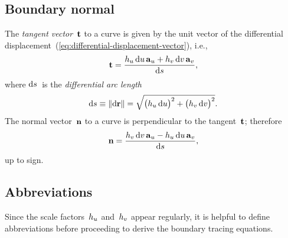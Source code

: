 \subsection{Boundary normal}
\label{sec:curvilinear.calculus.normal}

The \emph{tangent vector}~$\mathop{}\!\boldsymbol{\mathrm{t}}$ to a curve
is given by the unit vector of
the differential displacement~(\ref{eq:differential-displacement-vector}),
i.e.,
\begin{equation}
  \tangentvec =
    \frac{
      \scalefac{u} \td u \basisvec{u}
        +
      \scalefac{v} \td v \basisvec{v}
    }{
      \td s
    },
  \label{eq:tangent-vector}
\end{equation}
where $\mathop{}\!\mathrm{d} s$~is the \emph{differential arc length}
\begin{equation}
  \td s \defeq \norm{\td \vec{r}} =
  \sqrt{
    \roundbr[\big]{\scalefac{u} \td u}^2
      +
    \roundbr[\big]{\scalefac{v} \td v}^2
  }.
  \label{eq:differential-arc-length}
\end{equation}
The normal vector~$\mathop{}\!\boldsymbol{\mathrm{n}}$ to a curve
is perpendicular to the tangent~$\mathop{}\!\boldsymbol{\mathrm{t}}$;
therefore
\begin{equation}
  \normalvec =
    \frac{
      \scalefac{v} \td v \basisvec{u}
        -
      \scalefac{u} \td u \basisvec{v}
    }{
      \td s
    },
  \label{eq:normal-vector}
\end{equation}
up to sign.

\subsection{Abbreviations}
\label{sec:curvilinear.calculus.abbreviations}

Since the scale factors~$h_{u}$ and~$h_{v}$ appear regularly,
it is helpful to define abbreviations
before proceeding to derive the boundary tracing equations.

